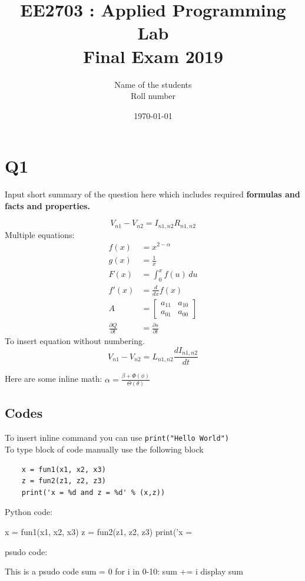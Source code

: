 \documentclass[12pt, a4paper]{report}
\title{\textbf{EE2703 : Applied Programming Lab \\ Final Exam 2019}}
\author{Name of the students \\ Roll number} %
\date{\today} %
\begin{document}
		
		
\maketitle %
\section*{Q1}
 Input short summary of the question here which includes required  \textbf{formulas and facts and properties.} 
 
 \begin{equation}\label{eq:1}
 V_{n1}-V_{n2}=I_{n1,n2} R_{n1,n2}
 \end{equation}
 Multiple equations:
 \begin{align}
    f(x) &= x^{2-\alpha}\\
    g(x) &= \frac{1}{x}\\
    F(x) &= \int_{0}^{x} f(u)\,du\\
    f'(x) &= \frac{d}{dx}f(x)\\
    A    &= \begin{bmatrix}
            a_{1 1} & a_{1 0} \\
            a_{0 1} & a_{0 0}
           \end{bmatrix}\\
    \frac{\partial Q}{\partial t} &= \frac{\partial s}{\partial t}
 \end{align}
 To insert equation without numbering.
 \begin{equation*}
 V_{n1}-V_{n2}=L_{n1,n2} \frac{dI_{n1,n2}}{dt}
 \end{equation*}
 
 Here are some inline math: $ \alpha = \frac{\beta + \Phi (\phi) }{\Theta ( \theta )} $
 
 
 
 
 
 
\subsection*{Codes}
 To insert inline command you can use \texttt{print("Hello World")} \\
To type block of code manually use the following block
\begin{verbatim}	
    x = fun1(x1, x2, x3)
    z = fun2(z1, z2, z3)
    print('x = %d and z = %d' % (x,z))
\end{verbatim}
Python code:
\begin{py_code}
    x = fun1(x1, x2, x3)
    z = fun2(z1, z2, z3)
    print('x = %
\end{py_code}
psudo code:
\begin{psudo}
This is a psudo code
sum = 0
for i in 0-10:
    sum += i
display sum
\end{psudo}
\end{document}
